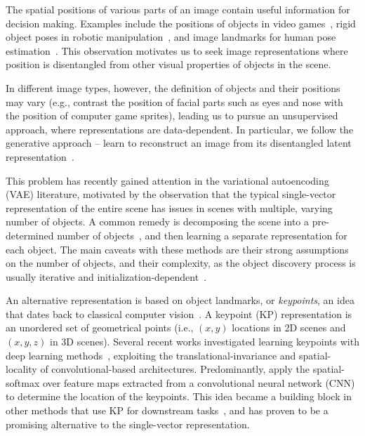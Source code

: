 \documentclass[nohyperref]{article}
\theoremstyle{plain}
\theoremstyle{definition}
\theoremstyle{remark}
\begin{document}
The spatial positions of various parts of an image contain useful information for decision making. Examples include the positions of objects in video games~\cite{smirnov2021marionette}, rigid object poses in robotic manipulation~\cite{byravan2017se3}, and image landmarks for human pose estimation~\cite{jakab2018unsupervised}. This observation motivates us to seek image representations where position is disentangled from other visual properties of objects in the scene.

In different image types, however, the definition of objects and their positions may vary (e.g., contrast the position of facial parts such as  eyes and nose with the position of computer game sprites), leading us to pursue an unsupervised approach, where representations are data-dependent. In particular, we follow the generative approach -- learn to reconstruct an image from its disentangled latent representation~\cite{burgess2019monet}.


This problem has recently gained attention in the variational autoencoding (VAE) literature, 
motivated by the observation that the typical single-vector representation of the entire scene has issues in scenes with multiple, varying number of objects. A common remedy is decomposing the scene into a pre-determined number of objects~\citep{burgess2019monet, watters2019cobra, kipf2019cswm}, and then learning a separate representation for each object. The main caveats with these methods are their strong assumptions on the number of objects, and their complexity, as the object discovery process is usually iterative and initialization-dependent~\citep{burgess2019monet, kipf2019cswm}.


An alternative representation is based on object landmarks, or \textit{keypoints}, an idea that dates back to classical computer vision~\citep{sift99}. A keypoint (KP) representation is an unordered set of geometrical points (i.e., $(x, y)$ locations in 2D scenes and $(x,y,z)$ in 3D scenes). Several recent works investigated learning keypoints with deep learning methods~\citep{jakab2018unsupervised, thewlis2017unsupervised1, zhang2018kp, lorenz2019unsupervised, dundar2021unsupervised}, exploiting the translational-invariance and spatial-locality of convolutional-based architectures. Predominantly, \citet{jakab2018unsupervised} apply the  spatial-softmax over feature maps extracted from a convolutional neural network (CNN) to determine the location of the keypoints. This idea became a building block in other methods that use KP for downstream tasks~\citep{kulkarni2019transporter, gopalakrishnan2020permakey, boney2021keyq, he2021latentkeypointgan}, and has proven to be a promising alternative to the single-vector representation.
\end{document}

